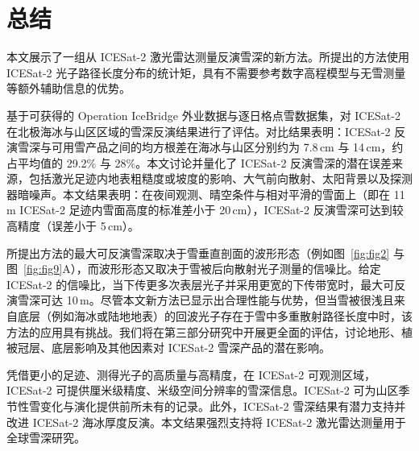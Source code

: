\section{总结}
本文展示了一组从 ICESat-2 激光雷达测量反演雪深的新方法。所提出的方法使用 ICESat-2 光子路径长度分布的统计矩，具有不需要参考数字高程模型与无雪测量等额外辅助信息的优势。

基于可获得的 Operation IceBridge 外业数据与逐日格点雪数据集，对 ICESat-2 在北极海冰与山区区域的雪深反演结果进行了评估。对比结果表明：ICESat-2 反演雪深与可用雪产品之间的均方根差在海冰与山区分别约为 7.8\,cm 与 14\,cm，约占平均值的 29.2\% 与 28\%。本文讨论并量化了 ICESat-2 反演雪深的潜在误差来源，包括激光足迹内地表粗糙度或坡度的影响、大气前向散射、太阳背景以及探测器暗噪声。本文结果表明：在夜间观测、晴空条件与相对平滑的雪面上（即在 11\,m ICESat-2 足迹内雪面高度的标准差小于 20\,cm），ICESat-2 反演雪深可达到较高精度（误差小于 5\,cm）。

所提出方法的最大可反演雪深取决于雪垂直剖面的波形形态（例如图~\ref{fig:fig2} 与图~\ref{fig:fig9}A），而波形形态又取决于雪被后向散射光子测量的信噪比。给定 ICESat-2 的信噪比，当下传更多次表层光子并采用更宽的下传带宽时，最大可反演雪深可达 10\,m。尽管本文新方法已显示出合理性能与优势，但当雪被很浅且来自底层（例如海冰或陆地地表）的回波光子存在于雪中多重散射路径长度中时，该方法的应用具有挑战。我们将在第三部分研究中开展更全面的评估，讨论地形、植被冠层、底层影响及其他因素对 ICESat-2 雪深产品的潜在影响。

凭借更小的足迹、测得光子的高质量与高精度，在 ICESat-2 可观测区域，ICESat-2 可提供厘米级精度、米级空间分辨率的雪深信息。ICESat-2 可为山区季节性雪变化与演化提供前所未有的记录。此外，ICESat-2 雪深结果有潜力支持并改进 ICESat-2 海冰厚度反演。本文结果强烈支持将 ICESat-2 激光雷达测量用于全球雪深研究。

\begingroup
\linespread{1.0}\selectfont
\printbibliography[title={外文翻译参考文献}]
\endgroup
